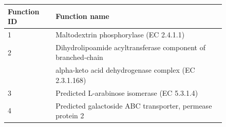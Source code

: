 \begin{figure}[h]
\begin{center}
{\begin{tabular}{|l|l|}
\hline
\bf{Function ID} & \bf{Function name}\\ \hline
1 & Maltodextrin phosphorylase (EC 2.4.1.1) \\ \hline
2 & Dihydrolipoamide acyltransferase component of branched-chain \\
& alpha-keto acid dehydrogenase complex (EC 2.3.1.168) \\ \hline
3 & Predicted L-arabinose isomerase (EC 5.3.1.4) \\ \hline
4 & Predicted galactoside ABC transporter, permease protein 2 \\ \hline
\end{tabular}
}
\label{nafld_metagenomic_carb_pca}
\end{center}
\end{figure}

